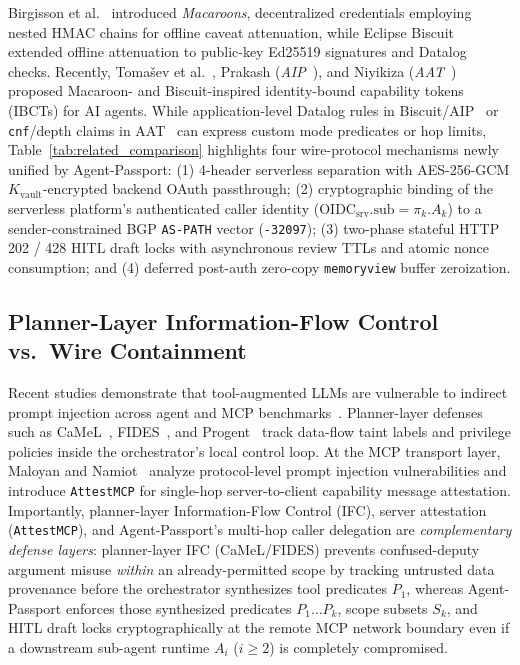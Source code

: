 \documentclass[conference,10pt]{IEEEtran}
\begin{document}
Birgisson et al.~\cite{birgisson2014macaroons} introduced \emph{Macaroons}, decentralized credentials employing nested HMAC chains for offline caveat attenuation, while Eclipse Biscuit extended offline attenuation to public-key Ed25519 signatures and Datalog checks. Recently, Toma\v{s}ev et al.~\cite{tomasev2026delegation}, Prakash (\emph{AIP}~\cite{prakash2026aip}), and Niyikiza (\emph{AAT}~\cite{niyikiza2026aat}) proposed Macaroon- and Biscuit-inspired identity-bound capability tokens (IBCTs) for AI agents. While application-level Datalog rules in Biscuit/AIP~\cite{prakash2026aip} or \texttt{cnf}/depth claims in AAT~\cite{niyikiza2026aat} can express custom mode predicates or hop limits, Table~\ref{tab:related_comparison} highlights four wire-protocol mechanisms newly unified by Agent-Passport: (1) 4-header serverless separation with AES-256-GCM $K_{\text{vault}}$-encrypted backend OAuth passthrough; (2) cryptographic binding of the serverless platform's authenticated caller identity ($\text{OIDC}_{\text{srv}}.\text{sub} = \pi_k.A_k$) to a sender-constrained BGP \texttt{AS-PATH} vector (\texttt{-32097}); (3) two-phase stateful HTTP 202 / 428 HITL draft locks with asynchronous review TTLs and atomic nonce consumption; and (4) deferred post-auth zero-copy \texttt{memoryview} buffer zeroization.

\subsection{Planner-Layer Information-Flow Control vs.\ Wire Containment}
Recent studies demonstrate that tool-augmented LLMs are vulnerable to indirect prompt injection across agent and MCP benchmarks~\cite{greshake2023promptinjection, zhan2024injecagent, debenedetti2024agentdojo, zhang2025asb}. Planner-layer defenses such as CaMeL~\cite{debenedetti2025camel}, FIDES~\cite{costa2025fides}, and Progent~\cite{shi2025progent} track data-flow taint labels and privilege policies inside the orchestrator's local control loop. At the MCP transport layer, Maloyan and Namiot~\cite{maloyan2026mcpsec} analyze protocol-level prompt injection vulnerabilities and introduce \texttt{AttestMCP} for single-hop server-to-client capability message attestation. Importantly, planner-layer Information-Flow Control (IFC), server attestation (\texttt{AttestMCP}), and Agent-Passport's multi-hop caller delegation are \emph{complementary defense layers}: planner-layer IFC (CaMeL/FIDES) prevents confused-deputy argument misuse \emph{within} an already-permitted scope by tracking untrusted data provenance before the orchestrator synthesizes tool predicates $P_1$, whereas Agent-Passport enforces those synthesized predicates $P_1 \dots P_k$, scope subsets $S_k$, and HITL draft locks cryptographically at the remote MCP network boundary even if a downstream sub-agent runtime $A_i$ ($i \ge 2$) is completely compromised.
\end{document}
